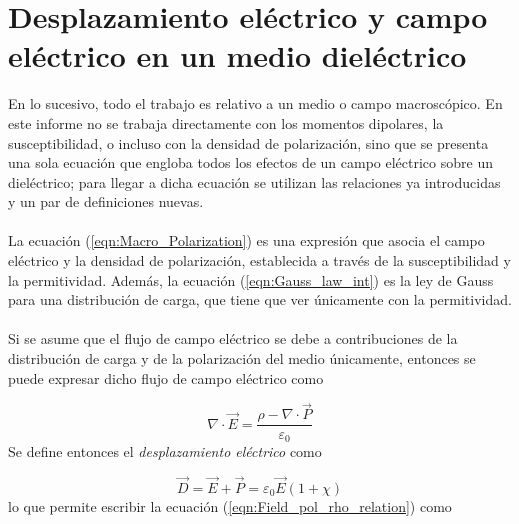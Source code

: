 \documentclass[12pt, twoside, onehalfspace, numbers, spanish]{ezthesis}
\numberwithin{equation}{section}
\begin{document}
\section{Desplazamiento eléctrico y campo eléctrico en un medio dieléctrico}\label{Sec:Elec_Displacement}
En lo sucesivo, todo el trabajo es relativo a un medio o campo macroscópico. En este informe no se trabaja directamente con los momentos dipolares, la susceptibilidad, o incluso con la densidad de polarización, sino que se presenta una sola ecuación que engloba todos los efectos de un campo eléctrico sobre un dieléctrico; para llegar a dicha ecuación se utilizan las relaciones ya introducidas y un par de definiciones nuevas.\\\\
La ecuación (\ref{eqn:Macro_Polarization}) es una expresión que asocia el campo eléctrico y la densidad de polarización, establecida a través de la susceptibilidad y la permitividad. Además, la ecuación (\ref{eqn:Gauss_law_int}) es la ley de Gauss para una distribución de carga, que tiene que ver únicamente con la permitividad.\\\\
Si se asume que el flujo de campo eléctrico se debe a contribuciones de la distribución de carga y de la polarización del medio únicamente, entonces se puede expresar dicho flujo de campo eléctrico como

\begin{equation}\label{eqn:Field_pol_rho_relation}
\nabla\cdot\vec{E} = \frac{\rho - \nabla\cdot\vec{P}}{\varepsilon_0}
\end{equation}
\noindent
Se define entonces el \textit{desplazamiento eléctrico} como

\begin{equation}\label{eqn:Electric_Displacement}
\vec{D} = \vec{E} + \vec{P} = \varepsilon_0\vec{E}(1 + \chi)
\end{equation}
\noindent
lo que permite escribir la ecuación (\ref{eqn:Field_pol_rho_relation}) como
\end{document}
